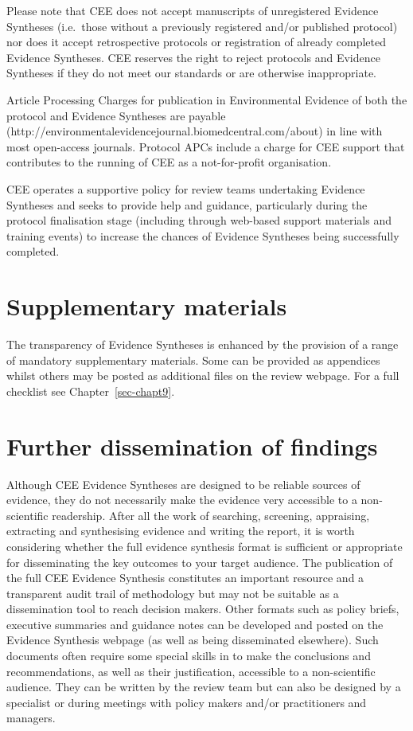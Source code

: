 \documentclass[
  letterpaper,
  DIV=11,
  numbers=noendperiod]{scrreprt}
\begin{document}
Please note that CEE does not accept manuscripts of unregistered
Evidence Syntheses (i.e.~those without a previously registered and/or
published protocol) nor does it accept retrospective protocols or
registration of already completed Evidence Syntheses. CEE reserves the
right to reject protocols and Evidence Syntheses if they do not meet our
standards or are otherwise inappropriate.

Article Processing Charges for publication in Environmental Evidence of
both the protocol and Evidence Syntheses are payable
(http://environmentalevidencejournal.biomedcentral.com/about) in line
with most open-access journals. Protocol APCs include a charge for CEE
support that contributes to the running of CEE as a not-for-profit
organisation.

CEE operates a supportive policy for review teams undertaking Evidence
Syntheses and seeks to provide help and guidance, particularly during
the protocol finalisation stage (including through web-based support
materials and training events) to increase the chances of Evidence
Syntheses being successfully completed.

\section{\texorpdfstring{\textbf{Supplementary
materials}}{Supplementary materials}}\label{supplementary-materials}

The transparency of Evidence Syntheses is enhanced by the provision of a
range of mandatory supplementary materials. Some can be provided as
appendices whilst others may be posted as additional files on the review
webpage. For a full checklist see Chapter~\ref{sec-chapt9}.

\section{\texorpdfstring{\textbf{Further dissemination of
findings}}{Further dissemination of findings}}\label{further-dissemination-of-findings}

Although CEE Evidence Syntheses are designed to be reliable sources of
evidence, they do not necessarily make the evidence very accessible to a
non-scientific readership. After all the work of searching, screening,
appraising, extracting and synthesising evidence and writing the report,
it is worth considering whether the full evidence synthesis format is
sufficient or appropriate for disseminating the key outcomes to your
target audience. The publication of the full CEE Evidence Synthesis
constitutes an important resource and a transparent audit trail of
methodology but may not be suitable as a dissemination tool to reach
decision makers. Other formats such as policy briefs, executive
summaries and guidance notes can be developed and posted on the Evidence
Synthesis webpage (as well as being disseminated elsewhere). Such
documents often require some special skills in to make the conclusions
and recommendations, as well as their justification, accessible to a
non-scientific audience. They can be written by the review team but can
also be designed by a specialist or during meetings with policy makers
and/or practitioners and managers.
\end{document}
